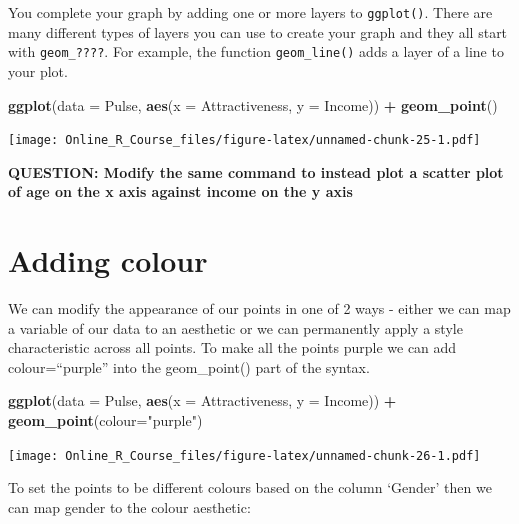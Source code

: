 \documentclass[]{book}
\newenvironment{Shaded}{\begin{snugshade}}{\end{snugshade}}
\newcommand{\DataTypeTok}[1]{\textcolor[rgb]{0.13,0.29,0.53}{#1}}
\newcommand{\KeywordTok}[1]{\textcolor[rgb]{0.13,0.29,0.53}{\textbf{#1}}}
\newcommand{\NormalTok}[1]{#1}
\newcommand{\OperatorTok}[1]{\textcolor[rgb]{0.81,0.36,0.00}{\textbf{#1}}}
\newcommand{\StringTok}[1]{\textcolor[rgb]{0.31,0.60,0.02}{#1}}
\begin{document}
You complete your graph by adding one or more layers to \texttt{ggplot()}. There are many different types of layers you can use to create your graph and they all start with \texttt{geom\_????}. For example, the function \texttt{geom\_line()} adds a layer of a line to your plot.

\begin{Shaded}
\begin{Highlighting}[]
\KeywordTok{ggplot}\NormalTok{(}\DataTypeTok{data =}\NormalTok{ Pulse,  }\KeywordTok{aes}\NormalTok{(}\DataTypeTok{x =}\NormalTok{ Attractiveness, }\DataTypeTok{y =}\NormalTok{ Income)) }\OperatorTok{+}
\StringTok{  }\KeywordTok{geom_point}\NormalTok{()}
\end{Highlighting}
\end{Shaded}

\texttt{[image: Online\_R\_Course\_files/figure-latex/unnamed-chunk-25-1.pdf]}

\textbf{QUESTION: Modify the same command to instead plot a scatter plot of age on the x axis against income on the y axis}

\hypertarget{adding-colour}{%
\section{Adding colour}\label{adding-colour}}

We can modify the appearance of our points in one of 2 ways - either we can map a variable of our data to an aesthetic or we can permanently apply a style characteristic across all points. To make all the points purple we can add colour=``purple'' into the geom\_point() part of the syntax.

\begin{Shaded}
\begin{Highlighting}[]
\KeywordTok{ggplot}\NormalTok{(}\DataTypeTok{data =}\NormalTok{ Pulse,  }\KeywordTok{aes}\NormalTok{(}\DataTypeTok{x =}\NormalTok{ Attractiveness, }\DataTypeTok{y =}\NormalTok{ Income)) }\OperatorTok{+}\StringTok{ }
\StringTok{  }\KeywordTok{geom_point}\NormalTok{(}\DataTypeTok{colour=}\StringTok{"purple"}\NormalTok{)}
\end{Highlighting}
\end{Shaded}

\texttt{[image: Online\_R\_Course\_files/figure-latex/unnamed-chunk-26-1.pdf]}

To set the points to be different colours based on the column `Gender' then we can map gender to the colour aesthetic:
\end{document}
